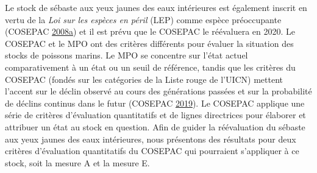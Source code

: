 \documentclass[french,11pt]{book}
\begin{document}
\clearpage

\label{app:cosewic}

Le stock de sébaste aux yeux jaunes des eaux intérieures est également inscrit en vertu de la \emph{Loi sur les espèces en péril} (LEP) comme espèce préoccupante (COSEPAC \protect\hyperlink{ref-cosewic2008}{2008}\protect\hyperlink{ref-cosewic2008}{a}) et il est prévu que le COSEPAC le réévaluera en 2020. Le COSEPAC et le MPO ont des critères différents pour évaluer la situation des stocks de poissons marins. Le MPO se concentre sur l'état actuel comparativement à un état ou un seuil de référence, tandis que les critères du COSEPAC (fondés sur les catégories de la Liste rouge de l'UICN) mettent l'accent sur le déclin observé au cours des générations passées et sur la probabilité de déclins continus dans le futur (COSEPAC \protect\hyperlink{ref-cosewic2015}{2019}). Le COSEPAC applique une série de critères d'évaluation quantitatifs et de lignes directrices pour élaborer et attribuer un état au stock en question. Afin de guider la réévaluation du sébaste aux yeux jaunes des eaux intérieures, nous présentons des résultats pour deux critères d'évaluation quantitatifs du COSEPAC qui pourraient s'appliquer à ce stock, soit la mesure A et la mesure E.

\hypertarget{mesure-a-du-cosepac}{%
\label{mesure-a-du-cosepac}}
\end{document}
